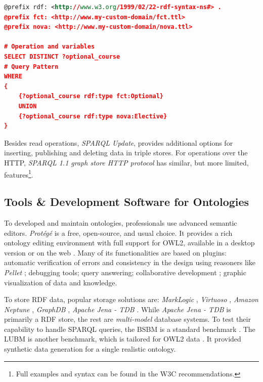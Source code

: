 \begin{lstlisting}[language=XML, caption={\gls{SPARQL} a more complex pattern example}, label={listing-sparql-complex-example}]
@prefix rdf: <http://www.w3.org/1999/02/22-rdf-syntax-ns#> .
@prefix fct: <http://www.my-custom-domain/fct.ttl>
@prefix nova: <http://www.my-custom-domain/nova.ttl>

# Operation and variables
SELECT DISTINCT ?optional_course
# Query Pattern
WHERE
{
    {?optional_course rdf:type fct:Optional}
    UNION
    {?optional_course rdf:type nova:Elective}
}
\end{lstlisting}

Besides read operations, \emph{\gls{SPARQL} Update}, provides additional options for inserting, publishing and deleting data in triple stores. For operations over the \gls{HTTP}, \emph{\gls{SPARQL} 1.1 graph store \gls{HTTP} protocol} has similar, but more limited, features\footnote{Full examples and syntax can be found in the \gls{W3C} recommendations.}.


\subsection{Tools \& Development Software for Ontologies}
\label{ch2:sec:semantic-web:tools}

To developed and maintain ontologies, professionals use advanced semantic editors. \emph{Protégé} \autocite{Musen2015-kh} is a free, open-source, and usual choice. It provides a rich ontology editing environment with full support for \gls{OWL2}, available in a desktop version or on the web \autocite{Tudorache2009-ja}. Many of its functionalities are based on plugins: automatic verification of errors and consistency in the design using reasoners like \emph{Pellet} \autocite{Sirin2007-lo}; debugging tools; query answering; collaborative development \autocite{Tudorache2008-tu}; graphic visualization of data and knowledge.

To store RDF data, popular storage solutions are: \emph{MarkLogic} \autocite{}, \emph{Virtuoso} \autocite{OpenLink_Software_undated-km}, \emph{Amazon Neptune} \autocite{Amazon_Web_Services_Inc_or_its_affiliates_undated-fj}, \emph{GraphDB} \autocite{Ontotext_undated-mj}, \emph{Apache Jena - TDB} \autocite{The_Apache_Software_Foundation_undated-mg}. While \emph{Apache Jena - TDB} is primarily a \gls{RDF} store, the rest are \emph{multi-model} database systems. To test their capability to handle \gls{SPARQL} queries, the \gls{BSBM} is a standard benchmark \autocite{Chris_undated-hq}. The \gls{LUBM} is another benchmark, which is tailored for \gls{OWL2} data \autocite{Guo2005-ja}. It provided synthetic data generation for a single realistic ontology.

